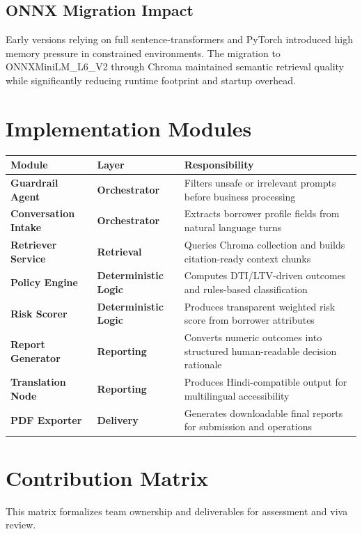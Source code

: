 \documentclass[12pt,a4paper]{article}
\begin{document}
\subsection{ONNX Migration Impact}
Early versions relying on full sentence-transformers and PyTorch introduced high memory pressure in constrained environments. The migration to ONNXMiniLM\_L6\_V2 through Chroma maintained semantic retrieval quality while significantly reducing runtime footprint and startup overhead.

\section{Implementation Modules}

\begin{tabularx}{\textwidth}{>{\bfseries}p{} >{\bfseries}p{} X}
\toprule
Module & Layer & Responsibility \\
\midrule
Guardrail Agent & Orchestrator & Filters unsafe or irrelevant prompts before business processing \\
Conversation Intake & Orchestrator & Extracts borrower profile fields from natural language turns \\
Retriever Service & Retrieval & Queries Chroma collection and builds citation-ready context chunks \\
Policy Engine & Deterministic Logic & Computes DTI/LTV-driven outcomes and rules-based classification \\
Risk Scorer & Deterministic Logic & Produces transparent weighted risk score from borrower attributes \\
Report Generator & Reporting & Converts numeric outcomes into structured human-readable decision rationale \\
Translation Node & Reporting & Produces Hindi-compatible output for multilingual accessibility \\
PDF Exporter & Delivery & Generates downloadable final reports for submission and operations \\
\bottomrule
\end{tabularx}

\section{Contribution Matrix}

This matrix formalizes team ownership and deliverables for assessment and viva review.
\end{document}
